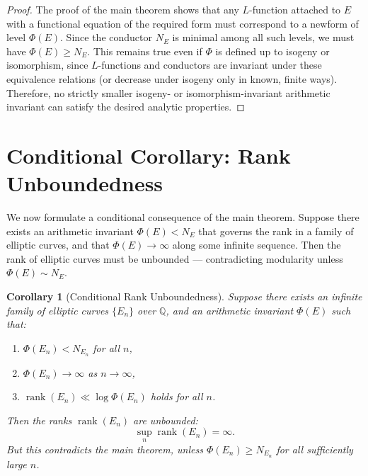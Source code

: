 \documentclass[a4paper,11pt]{article}
\newtheorem{corollary}{Corollary}
\theoremstyle{thmstyleone}%
\theoremstyle{thmstyletwo}%
\theoremstyle{thmstylethree}%
\begin{document}
	\begin{proof}
		The proof of the main theorem shows that any \( L \)-function attached to \( E \) with a functional equation of the required form must correspond to a newform of level \( \Phi(E) \). Since the conductor \( N_E \) is minimal among all such levels, we must have \( \Phi(E) \ge N_E \). This remains true even if \( \Phi \) is defined up to isogeny or isomorphism, since \( L \)-functions and conductors are invariant under these equivalence relations (or decrease under isogeny only in known, finite ways). Therefore, no strictly smaller isogeny- or isomorphism-invariant arithmetic invariant can satisfy the desired analytic properties.
	\end{proof}
	
	\section{Conditional Corollary: Rank Unboundedness}
	
	We now formulate a conditional consequence of the main theorem. Suppose there exists an arithmetic invariant \( \Phi(E) < N_E \) that governs the rank in a family of elliptic curves, and that \( \Phi(E) \to \infty \) along some infinite sequence. Then the rank of elliptic curves must be unbounded — contradicting modularity unless \( \Phi(E) \sim N_E \).
	
	\begin{corollary}[Conditional Rank Unboundedness]
		Suppose there exists an infinite family of elliptic curves \( \{E_n\} \) over \( \mathbb{Q} \), and an arithmetic invariant \( \Phi(E) \) such that:
		\begin{enumerate}
			\item \( \Phi(E_n) < N_{E_n} \) for all \( n \),
			\item \( \Phi(E_n) \to \infty \) as \( n \to \infty \),
			\item \( \operatorname{rank}(E_n) \ll \log \Phi(E_n) \) holds for all \( n \).
		\end{enumerate}
		Then the ranks \( \operatorname{rank}(E_n) \) are unbounded:
		\[
		\sup_n \operatorname{rank}(E_n) = \infty.
		\]
		But this contradicts the main theorem, unless \( \Phi(E_n) \ge N_{E_n} \) for all sufficiently large \( n \).
	\end{corollary}
	
\end{document}
